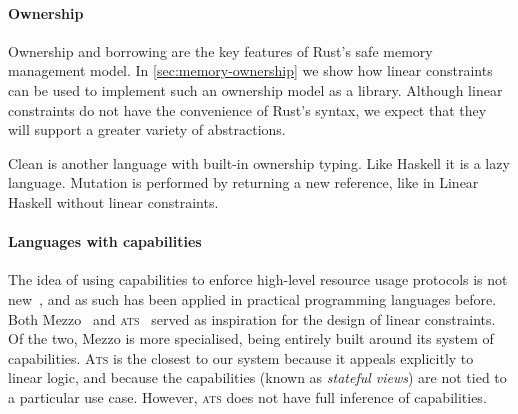 \documentclass[acmsmall,usenames,dvipsnames,natbib=false,acmthm=false,screen]{acmart}
\theoremstyle{acmplain}
\theoremstyle{acmdefinition}
\begin{document}
\paragraph{Ownership}

%
Ownership and borrowing are the key features of Rust's safe memory management model.
In \cref{sec:memory-ownership} we show how linear constraints can be used to
implement such an ownership model as a library.
Although linear constraints do not have the
convenience of Rust's syntax, we expect that they will support a
greater variety of abstractions.

Clean is another language with built-in ownership typing. Like Haskell
it is a lazy language. Mutation is performed by returning a new
reference, like in Linear Haskell without linear constraints.

\paragraph{Languages with capabilities}

The idea of using capabilities to enforce high-level resource usage protocols is not new~\citep{DBLP:conf/pldi/DeLineF01},
and as such has been applied in practical programming languages before.
Both Mezzo~\cite{mezzo-permissions} and
\textsc{ats}~\cite{AtsLinearViews} served as inspiration for the
design of linear constraints. Of the two, Mezzo is more specialised,
being entirely built around its system of capabilities.  \textsc{Ats}
is the closest to our system because it appeals explicitly to linear
logic, and because the capabilities (known as \emph{stateful views})
are not tied to a particular use case. However,
\textsc{ats} does not have full inference of capabilities.
\end{document}
